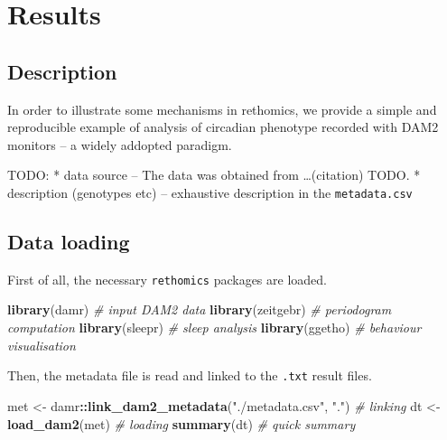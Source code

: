 \documentclass[]{article}
\title{}
\author{}
\date{}
\newenvironment{Shaded}{\begin{snugshade}}{\end{snugshade}}
\newcommand{\CommentTok}[1]{\textcolor[rgb]{0.56,0.35,0.01}{\textit{#1}}}
\newcommand{\KeywordTok}[1]{\textcolor[rgb]{0.13,0.29,0.53}{\textbf{#1}}}
\newcommand{\NormalTok}[1]{#1}
\newcommand{\OperatorTok}[1]{\textcolor[rgb]{0.81,0.36,0.00}{\textbf{#1}}}
\newcommand{\StringTok}[1]{\textcolor[rgb]{0.31,0.60,0.02}{#1}}
\begin{document}
\hypertarget{results}{%
\section{Results}\label{results}}

\hypertarget{description}{%
\subsection{Description}\label{description}}

In order to illustrate some mechanisms in rethomics, we provide a simple
and reproducible example of analysis of circadian phenotype recorded
with DAM2 monitors -- a widely addopted paradigm.

TODO: * data source -- The data was obtained from \ldots{}(citation)
TODO. * description (genotypes etc) -- exhaustive description in the
\texttt{metadata.csv}

\hypertarget{data-loading}{%
\subsection{Data loading}\label{data-loading}}

First of all, the necessary \texttt{rethomics} packages are loaded.

\begin{Shaded}
\begin{Highlighting}[]
\KeywordTok{library}\NormalTok{(damr)      }\CommentTok{# input DAM2 data}
\KeywordTok{library}\NormalTok{(zeitgebr)  }\CommentTok{# periodogram computation}
\KeywordTok{library}\NormalTok{(sleepr)    }\CommentTok{# sleep analysis}
\KeywordTok{library}\NormalTok{(ggetho)    }\CommentTok{# behaviour visualisation}
\end{Highlighting}
\end{Shaded}

Then, the metadata file is read and linked to the \texttt{.txt} result
files.

\begin{Shaded}
\begin{Highlighting}[]
\NormalTok{met <-}\StringTok{ }\NormalTok{damr}\OperatorTok{::}\KeywordTok{link_dam2_metadata}\NormalTok{(}\StringTok{"./metadata.csv"}\NormalTok{, }\StringTok{"."}\NormalTok{) }\CommentTok{# linking}
\NormalTok{dt <-}\StringTok{ }\KeywordTok{load_dam2}\NormalTok{(met)                                   }\CommentTok{# loading}
\KeywordTok{summary}\NormalTok{(dt)                                            }\CommentTok{# quick summary}
\end{Highlighting}
\end{Shaded}
\end{document}
